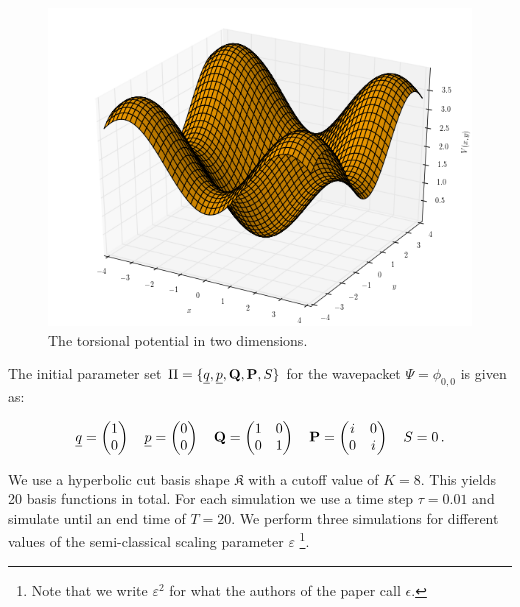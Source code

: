 \begin{figure}
  \centering
  \includegraphics[scale=0.35]{./fig/torsional.png}
  \caption{The torsional potential in two dimensions.}
  \label{fig:torsional_potential}
\end{figure}

The initial parameter set $\Pi = \{\underline{q}, \underline{p}, \mathbf{Q}, \mathbf{P}, S\}$
for the wavepacket $\Psi = \phi_{0,0}$ is given as:

\begin{align*}
  \underline{q} = \begin{pmatrix}
              1 \\ 0
            \end{pmatrix}
  \quad
  \underline{p} = \begin{pmatrix}
              0 \\ 0
            \end{pmatrix}
  \quad
  \mathbf{Q} = \begin{pmatrix}
              1 & 0 \\ 0 & 1
            \end{pmatrix}
  \quad
  \mathbf{P} = \begin{pmatrix}
              i & 0 \\ 0 & i
            \end{pmatrix}
  \quad
  S = 0 \,.
\end{align*}

We use a hyperbolic cut basis shape $\mathfrak{K}$ with a cutoff value of $K=8$.
This yields 20 basis functions in total. For each simulation we use a time step
$\tau = 0.01$ and simulate until an end time of $T=20$. We perform three simulations
for different values of the semi-classical scaling parameter $\varepsilon$
\footnote{Note that we write $\varepsilon^2$ for what the authors of the paper call $\epsilon$.}.

